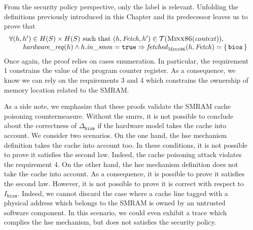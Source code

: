 From the security policy perspective, only the  label is relevant.
%
%
Unfolding the definitions previously introduced in this Chapter and its
predecessor
%
 leaves us to prove that 
%
\[
  \begin{array}{l}
    \forall (h, h') \in H(S) \times H(S) \text{ such that } (h, \mathit{Fetch}, h')
    \in \mathcal{T}(\textsc{Minx86}(\mathit{context})), \\
    \qquad \mathit{hardware\_req}(h) \wedge h.\mathit{in\_smm} = \mathtt{true}
    \Rightarrow \mathit{fetched}_{\textsc{Minx86}}(h, \mathit{Fetch}) =
    \{\,\mathtt{bios}\,\}
  \end{array}
\]
%
Once again, the proof relies on cases enumeration.
%
In particular, the requirement 1 constrains the value of the program counter
register.
%
As a consequence, we know we can rely on the requirements 3 and 4 which
constrains the ownership of memory location related to the SMRAM.
%

As a side note, we emphasize that these proofs validate the SMRAM cache
poisoning countermeasure.
%
Without the \acp{smrr}, it is not possible to conclude about the correctness of
\( \Delta_{\mathtt{bios}} \) if the hardware model takes the cache into account.
%
We consider two scenarios.
%
On the one hand, the \ac{hse} mechanism definition takes the cache into account
too.
%
In these conditions, it is not possible to prove it satisfies the second law.
%
Indeed, the cache poisoning attack violates the requirement 4.
%
On the other hand, the \ac{hse} mechanism definition does not take the cache
into account.
%
As a consequence, it is possible to prove it satisfies the second law.
%
However, it is not possible to prove it is correct with respect to
$I_{\mathtt{bios}}$.
%
Indeed, we cannot discard the case where a cache line tagged with a physical
address which belongs to the SMRAM is owned by an untrusted software component.
%
In this scenario, we could even exhibit a trace which complies the \ac{hse}
mechanism, but does not satisfies the security policy.

